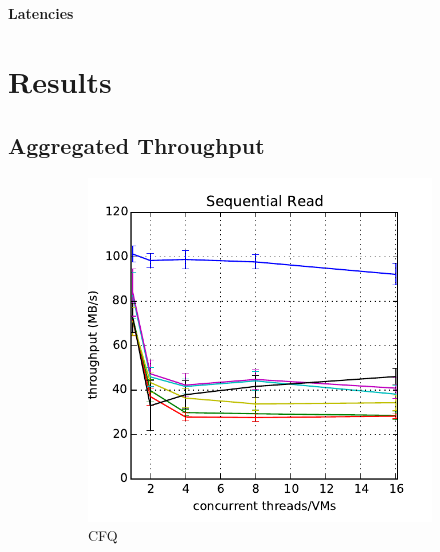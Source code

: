 \documentclass{acmsig}
\begin{document}
\paragraph{Latencies}


\section{Results}

\subsection{Aggregated Throughput}

\begin{figure}[t]
   \centering
   \begin{subfigure}[b]{0.3\textwidth}
     \includegraphics[width=\textwidth]{figures/throughput_cfq_read.pdf}
     \caption{CFQ}
     \label{fig:aggthroughput_cfq_read}
   \end{subfigure}%
   ~ %
   \begin{subfigure}[b]{0.3\textwidth}

\end{subfigure}
\end{figure}
\end{document}
